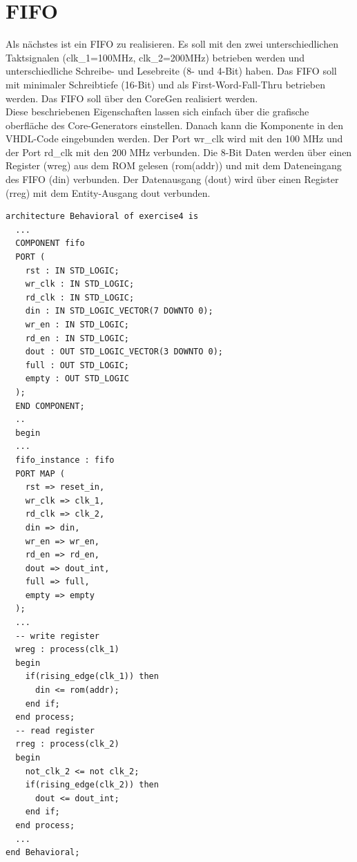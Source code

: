 \documentclass{article}
\newcommand{\enterProblemHeader}[1]{
}
\newcommand{\exitProblemHeader}[1]{
}
\newcounter{homeworkProblemCounter} %
\newcommand{\homeworkProblemName}{}
\newenvironment{homeworkProblem}[1][Problem \arabic{homeworkProblemCounter}]{ %
\stepcounter{homeworkProblemCounter} %
\renewcommand{\homeworkProblemName}{#1} %
\section{\homeworkProblemName} %
\enterProblemHeader{\homeworkProblemName} %
}{
\exitProblemHeader{\homeworkProblemName} %
}
\begin{document}

\begin{homeworkProblem}[FIFO]
Als nächstes ist ein FIFO zu realisieren. Es soll mit den zwei unterschiedlichen 
Taktsignalen (clk\_1=100MHz, clk\_2=200MHz) betrieben werden und unterschiedliche Schreibe-
und Lesebreite (8- und 4-Bit) haben. Das FIFO soll mit minimaler Schreibtiefe (16-Bit) und 
als First-Word-Fall-Thru betrieben werden. Das FIFO soll über den CoreGen realisiert werden.
\\
Diese beschriebenen Eigenschaften lassen sich einfach über die grafische oberfläche des
Core-Generators einstellen. Danach kann die Komponente in den VHDL-Code eingebunden werden.
Der Port wr\_clk wird mit den 100 MHz und der Port rd\_clk mit den 200 MHz verbunden.
Die 8-Bit Daten werden über einen Register (wreg) aus dem ROM gelesen (rom(addr)) und mit
dem Dateneingang des FIFO (din) verbunden. Der Datenausgang (dout) wird über einen Register
(rreg) mit dem Entity-Ausgang dout verbunden.
\begin{verbatim}
architecture Behavioral of exercise4 is
  ...
  COMPONENT fifo
  PORT (
    rst : IN STD_LOGIC;
    wr_clk : IN STD_LOGIC;
    rd_clk : IN STD_LOGIC;
    din : IN STD_LOGIC_VECTOR(7 DOWNTO 0);
    wr_en : IN STD_LOGIC;
    rd_en : IN STD_LOGIC;
    dout : OUT STD_LOGIC_VECTOR(3 DOWNTO 0);
    full : OUT STD_LOGIC;
    empty : OUT STD_LOGIC
  );
  END COMPONENT;
  ..
  begin
  ...
  fifo_instance : fifo
  PORT MAP (
    rst => reset_in,
    wr_clk => clk_1,
    rd_clk => clk_2,
    din => din,
    wr_en => wr_en,
    rd_en => rd_en,
    dout => dout_int,
    full => full,
    empty => empty
  );
  ...
  -- write register
  wreg : process(clk_1)
  begin
    if(rising_edge(clk_1)) then
      din <= rom(addr);
    end if;
  end process;
  -- read register
  rreg : process(clk_2)
  begin
    not_clk_2 <= not clk_2;
    if(rising_edge(clk_2)) then
      dout <= dout_int;
    end if;
  end process;
  ...
end Behavioral;
\end{verbatim}
\end{homeworkProblem}

\end{document}
